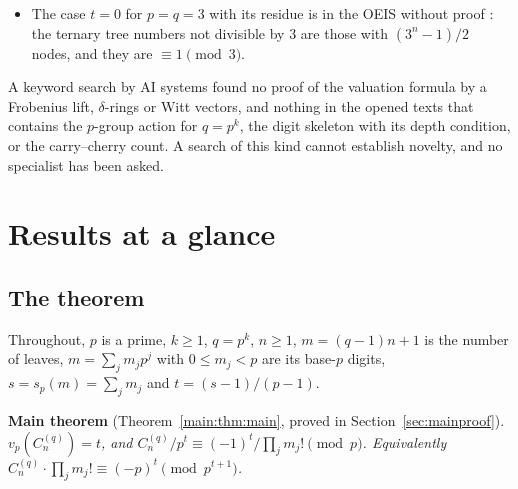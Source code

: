 \documentclass[11pt]{article}
\theoremstyle{definition}
\theoremstyle{remark}
\numberwithin{equation}{section}
\numberwithin{figure}{section}
\begin{document}
\begin{itemize}[itemsep=1pt]
 finite set, the number of points is congruent modulo $p$ to the number of fixed points. As recorded in the
 reference list from slides of Gessel \cite{Gessel}, J.~Petersen proved Fermat's and Wilson's theorems in
 this way in 1872, and Touchard's congruence for the Bell numbers is proved there by letting a $p$-cycle
 act on set partitions, the fixed partitions being those in which the $p$ points form one block (which is
 then collapsed) or $p$ singletons: the same kind of argument as our last step, on set partitions instead of
 trees. Petersen's paper itself was not located.
\item The case $t=0$ for $p=q=3$ with its residue is in the OEIS without proof \cite{OEISA201823}: the ternary
 tree numbers not divisible by $3$ are those with $(3^n-1)/2$ nodes, and they are $\equiv1\pmod 3$.
\end{itemize}
A keyword search by AI systems found no proof of the valuation formula by a Frobenius lift, $\delta$-rings or
Witt vectors, and nothing in the opened texts that contains the $p$-group action for $q=p^k$, the digit
skeleton with its depth condition, or the carry--cherry count. A search of this kind cannot establish novelty,
and no specialist has been asked.

\section{Results at a glance}\label{sec:results}

\subsection{The theorem}
Throughout, $p$ is a prime, $k\ge1$, $q=p^k$, $n\ge1$, $m=(q-1)n+1$ is the number of leaves,
$m=\sum_jm_jp^j$ with $0\le m_j<p$ are its base-$p$ digits, $s=s_p(m)=\sum_jm_j$ and $t=(s-1)/(p-1)$.

\medskip\noindent\textbf{Main theorem} (Theorem~\ref{main:thm:main}, proved in Section~\ref{sec:mainproof}).
\emph{$v_p(C_n^{(q)})=t$, and $C_n^{(q)}/p^t\equiv(-1)^t/\prod_jm_j!\pmod p$. Equivalently
$C_n^{(q)}\cdot\prod_jm_j!\equiv(-p)^t\pmod{p^{t+1}}$.}
\end{document}
